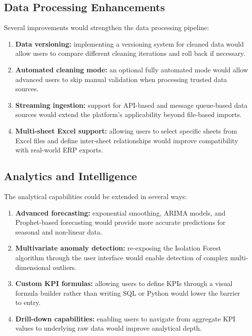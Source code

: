\subsection{Data Processing Enhancements}

\noindent
Several improvements would strengthen
the data processing pipeline:

\begin{enumerate}
  \item \textbf{Data versioning:}
        implementing a versioning system
        for cleaned data
        would allow users to compare
        different cleaning iterations
        and roll back if necessary.
  \item \textbf{Automated cleaning mode:}
        an optional fully automated mode
        would allow advanced users
        to skip manual validation
        when processing trusted data sources.
  \item \textbf{Streaming ingestion:}
        support for API-based
        and message queue-based data sources
        would extend the platform's applicability
        beyond file-based imports.
  \item \textbf{Multi-sheet Excel support:}
        allowing users to select
        specific sheets from Excel files
        and define inter-sheet relationships
        would improve compatibility
        with real-world ERP exports.
\end{enumerate}

\subsection{Analytics and Intelligence}

\noindent
The analytical capabilities
could be extended in several ways:

\begin{enumerate}
  \item \textbf{Advanced forecasting:}
        exponential smoothing,
        ARIMA models,
        and Prophet-based forecasting
        would provide more accurate predictions
        for seasonal and non-linear data.
  \item \textbf{Multivariate anomaly detection:}
        re-exposing the Isolation Forest algorithm
        through the user interface
        would enable detection of complex
        multi-dimensional outliers.
  \item \textbf{Custom KPI formulas:}
        allowing users to define KPIs
        through a visual formula builder
        rather than writing SQL or Python
        would lower the barrier to entry.
  \item \textbf{Drill-down capabilities:}
        enabling users to navigate
        from aggregate KPI values
        to underlying raw data
        would improve analytical depth.
\end{enumerate}

